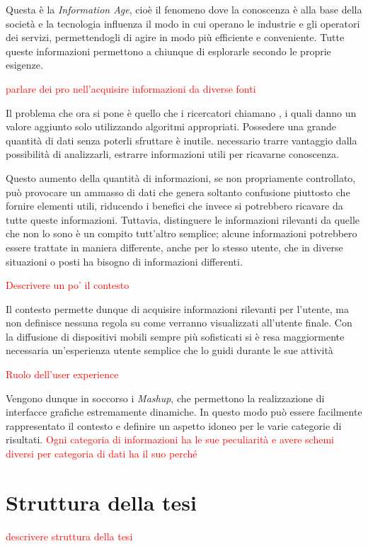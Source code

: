 Questa è la \emph{Information Age}, cioè il fenomeno dove la conoscenza è alla base della società e la tecnologia influenza il modo in cui operano le industrie e gli operatori dei servizi, permettendogli di agire in modo più efficiente e conveniente. Tutte queste informazioni permettono a chiunque di esplorarle secondo le proprie esigenze. 

\textcolor{red}{parlare dei pro nell'acquisire informazioni da diverse fonti}

Il problema che ora si pone è quello che i ricercatori chiamano , i quali danno un valore aggiunto solo utilizzando algoritmi appropriati. Possedere una grande quantità di dati senza poterli sfruttare è inutile. \upe necessario trarre vantaggio dalla possibilità di analizzarli, estrarre informazioni utili per ricavarne conoscenza. 

Questo aumento della quantità di informazioni, se non propriamente controllato, può provocare un ammasso di dati che genera soltanto confusione piuttosto che fornire elementi utili, riducendo i benefici che invece si potrebbero ricavare da tutte queste informazioni. Tuttavia, distinguere le informazioni rilevanti da quelle che non lo sono è un compito tutt'altro semplice; alcune informazioni potrebbero essere trattate in maniera differente, anche per lo stesso utente, che in diverse situazioni o posti ha bisogno di informazioni differenti. 

\textcolor{red}{Descrivere un po' il contesto}


Il contesto permette dunque di acquisire informazioni rilevanti per l'utente, ma non definisce nessuna regola su come verranno visualizzati all'utente finale. Con la diffusione di dispositivi mobili sempre più sofisticati si è resa maggiormente necessaria un'esperienza utente semplice che lo guidi durante le sue attività 

\textcolor{red}{Ruolo dell'user experience}

Vengono dunque in soccorso i \emph{Mashup}, che permettono la realizzazione di interfacce grafiche estremamente dinamiche. In questo modo può essere facilmente rappresentato il contesto e definire un aspetto idoneo per le varie categorie di risultati. \textcolor{red}{Ogni categoria di informazioni ha le sue peculiarità e avere schemi diversi per categoria di dati ha il suo perché}



\section{Struttura della tesi\label{sec:struttura-tesi}}




\textcolor{red}{descrivere struttura della tesi}